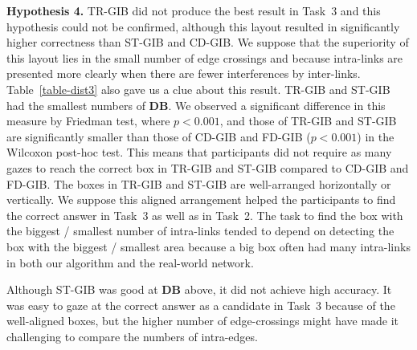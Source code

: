 \documentclass[review]{vgtc}                 %
\begin{document}
{\bf Hypothesis 4.} TR-GIB did not produce the best result in Task~3 and this hypothesis could not be confirmed, although this layout resulted in significantly higher correctness than ST-GIB and CD-GIB.
We suppose that the superiority of this layout lies in the small number of edge crossings and because intra-links are presented more clearly when there are fewer interferences by inter-links.
Table~\ref{table-dist3} also gave us a clue about this result.
TR-GIB and ST-GIB had the smallest numbers of {\bf DB}.
We observed a significant difference in this measure by Friedman test, where $p<0.001$, and those of TR-GIB and ST-GIB are significantly smaller than those of CD-GIB and FD-GIB ($p<0.001$) in the Wilcoxon post-hoc test.
This means that participants did not require as many gazes to reach the correct box in TR-GIB and ST-GIB compared to CD-GIB and FD-GIB.
The boxes in TR-GIB and ST-GIB are well-arranged horizontally or vertically.
We suppose this aligned arrangement helped the participants to find the correct answer in Task~3 as well as in Task~2.
The task to find the box with the biggest / smallest number of intra-links tended to depend on detecting the box with the biggest / smallest area because a big box often had many intra-links in both our algorithm and the real-world network.

Although ST-GIB was good at {\bf DB} above, it did not achieve high accuracy.
It was easy to gaze at the correct answer as a candidate in Task~3 because of the well-aligned boxes, but the higher number of edge-crossings might have made it challenging to compare the numbers of intra-edges.
\end{document}
